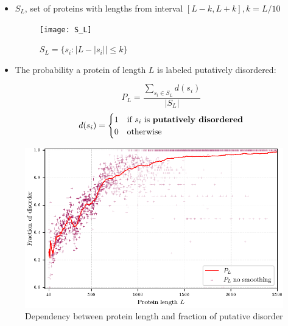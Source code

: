 \documentclass{beamer}
\newcommand{\keyword}[1]{\textbf{#1}}
\begin{document}
\begin{frame}{}



  \begin{itemize}
    \item
      $S_L$, set of proteins with lengths from interval
      $[L-k, L+k], k=L/10$
      \begin{figure}
        \centering
        \texttt{[image: S\_L]}
        \caption{ $ S_L = \{s_i :  | L -  | s_i | | \le k  \} $ }
      \end{figure}

      \pause

    \item

      The probability a protein of length $L$ is labeled putatively disordered:

      $$ P_L = \dfrac{ \sum_{s_i \in S_L} d(s_i)} {| S_L |} $$
      \[   
        d(s_i) = 
        \begin{cases}
        1 & \text{if  $s_i$ is \keyword{putatively disordered}}\\
        0 & \text{otherwise}
      \end{cases}
    \]

\end{itemize}
\end{frame}


\begin{frame}{}
  \begin{figure}[]
    \centering
    \includegraphics[scale=0.8]{plots/PL_F}
    \caption {
      \footnotesize Dependency between protein length and fraction of putative
      disorder
    }
  \end{figure}
\end{frame}
\end{document}
